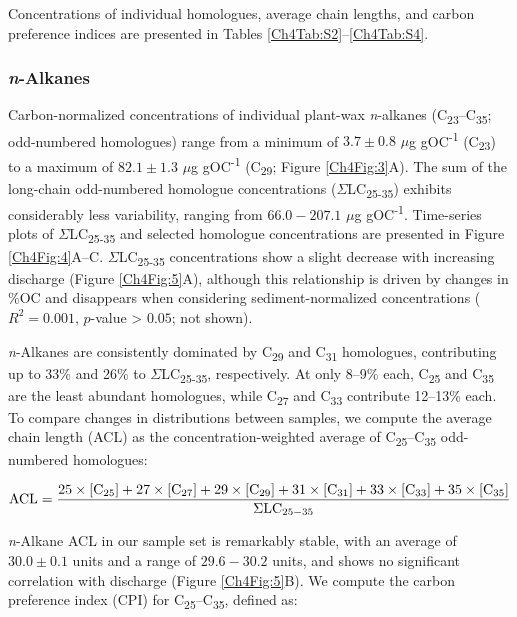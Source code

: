 Concentrations of individual homologues, average chain lengths, and carbon preference indices are presented in Tables \ref{Ch4Tab:S2}--\ref{Ch4Tab:S4}.

\subsubsection{\textit{n}-Alkanes}

Carbon-normalized concentrations of individual plant-wax \textit{n}-alkanes (C\textsubscript{23}--C\textsubscript{35}; odd-numbered homologues) range from a minimum of $3.7 \pm 0.8$ $\mu$g gOC\textsuperscript{-1} (C\textsubscript{23}) to a maximum of $82.1 \pm 1.3$ $\mu$g gOC\textsuperscript{-1} (C\textsubscript{29}; Figure \ref{Ch4Fig:3}A). The sum of the long-chain odd-numbered homologue concentrations ($\Sigma$LC\textsubscript{25-35}) exhibits considerably less variability, ranging from $66.0 - 207.1$ $\mu$g gOC\textsuperscript{-1}. Time-series plots of $\Sigma$LC\textsubscript{25-35} and selected homologue concentrations are presented in Figure \ref{Ch4Fig:4}A--C. $\Sigma$LC\textsubscript{25-35} concentrations show a slight decrease with increasing discharge (Figure \ref{Ch4Fig:5}A), although this relationship is driven by changes in \%OC and disappears when considering sediment-normalized concentrations ($R^2 = 0.001$, $p$-value > $0.05$; not shown).

\textit{n}-Alkanes are consistently dominated by C\textsubscript{29} and C\textsubscript{31} homologues, contributing up to 33\% and 26\% to $\Sigma$LC\textsubscript{25-35}, respectively. At only 8--9\% each, C\textsubscript{25} and C\textsubscript{35} are the least abundant homologues, while C\textsubscript{27} and C\textsubscript{33} contribute 12--13\% each. To compare changes in distributions between samples, we compute the average chain length (ACL) as the concentration-weighted average of C\textsubscript{25}--C\textsubscript{35} odd-numbered homologues:

\begin{equation}\label{Ch4Eq:1}
\text{ACL} = \frac{25\times[\ce{C}_{25}] + 27\times[\ce{C}_{27}] + 29\times[\ce{C}_{29}] + 31\times[\ce{C}_{31}] + 33\times[\ce{C}_{33}] + 35\times[\ce{C}_{35}]}{\Sigma \text{LC}_{25-35}}
\end{equation}

\textit{n}-Alkane ACL in our sample set is remarkably stable, with an average of $30.0 \pm 0.1$ units and a range of $29.6 - 30.2$ units, and shows no significant correlation with discharge (Figure \ref{Ch4Fig:5}B). We compute the carbon preference index (CPI) for C\textsubscript{25}--C\textsubscript{35}, defined as: 

